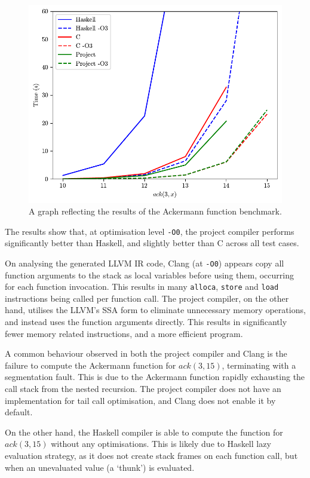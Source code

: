 \begin{figure}
    \includegraphics{Graphics/ackermann-benchmark.pdf}
    \caption{A graph reflecting the results of the Ackermann function benchmark.}
    \label{fig:ackermann-benchmark}
\end{figure}

The results show that, at optimisation level \texttt{-O0}, the
project compiler performs significantly better than Haskell, and slightly better than C across all
test cases.

On analysing the generated LLVM IR code, Clang (at \texttt{-O0}) appears copy all function arguments
to the stack as local variables before using them, occurring for each function invocation. This
results in many \texttt{alloca}, \texttt{store} and \texttt{load} instructions being called per
function call. The project compiler, on the other hand, utilises the LLVM's SSA form to eliminate
unnecessary memory operations, and instead uses the function arguments directly. This results in
significantly fewer memory related instructions, and a more efficient program.

A common behaviour observed in both the project compiler and Clang is the failure to compute the
Ackermann function for $ack(3,15)$, terminating with a segmentation fault. This is due to the
Ackermann function rapidly exhausting the call stack from the nested recursion. The project compiler
does not have an implementation for tail call optimisation, and Clang does not enable it by default.

On the other hand, the Haskell compiler is able to compute the function for $ack(3,15)$ without any
optimisations. This is likely due to Haskell lazy evaluation strategy, as it does not create stack
frames on each function call, but when an unevaluated value (a `thunk') is evaluated.

